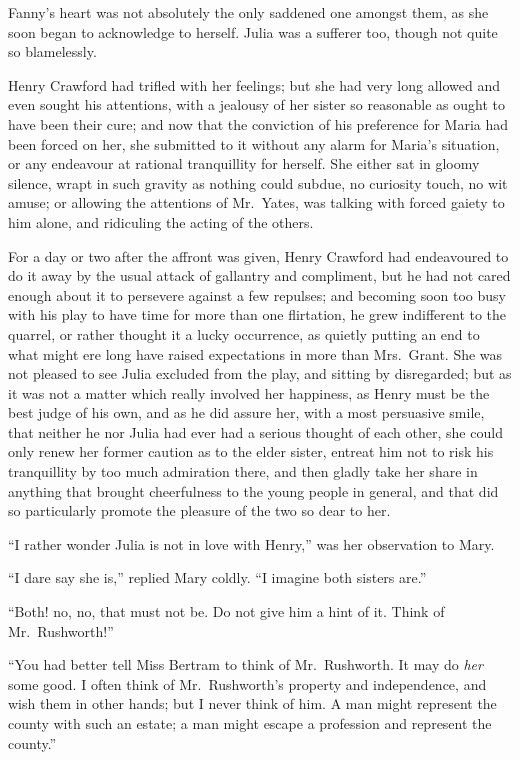 \documentclass{article}
\begin{document}
Fanny's heart was not absolutely the only saddened one
amongst them, as she soon began to acknowledge to herself.
Julia was a sufferer too, though not quite so blamelessly.

Henry Crawford had trifled with her feelings; but she
had very long allowed and even sought his attentions,
with a jealousy of her sister so reasonable as ought
to have been their cure; and now that the conviction
of his preference for Maria had been forced on her,
she submitted to it without any alarm for Maria's situation,
or any endeavour at rational tranquillity for herself.
She either sat in gloomy silence, wrapt in such gravity
as nothing could subdue, no curiosity touch, no wit amuse;
or allowing the attentions of Mr.\ Yates, was talking with
forced gaiety to him alone, and ridiculing the acting of
the others.

For a day or two after the affront was given,
Henry Crawford had endeavoured to do it away by the usual
attack of gallantry and compliment, but he had not cared
enough about it to persevere against a few repulses;
and becoming soon too busy with his play to have time
for more than one flirtation, he grew indifferent to
the quarrel, or rather thought it a lucky occurrence,
as quietly putting an end to what might ere long
have raised expectations in more than Mrs.\ Grant.
She was not pleased to see Julia excluded from the play,
and sitting by disregarded; but as it was not a matter
which really involved her happiness, as Henry must be the
best judge of his own, and as he did assure her, with a
most persuasive smile, that neither he nor Julia had ever
had a serious thought of each other, she could only renew
her former caution as to the elder sister, entreat him
not to risk his tranquillity by too much admiration there,
and then gladly take her share in anything that brought
cheerfulness to the young people in general, and that did
so particularly promote the pleasure of the two so dear to her.

``I rather wonder Julia is not in love with Henry,''
was her observation to Mary.

``I dare say she is,'' replied Mary coldly.  ``I imagine
both sisters are.''

``Both! no, no, that must not be.  Do not give him a hint
of it.  Think of Mr.\ Rushworth!''

``You had better tell Miss Bertram to think of Mr.\ Rushworth.
It may do \emph{her} some good.  I often think of Mr.\ Rushworth's
property and independence, and wish them in other hands;
but I never think of him.  A man might represent the county
with such an estate; a man might escape a profession
and represent the county.''
\end{document}
